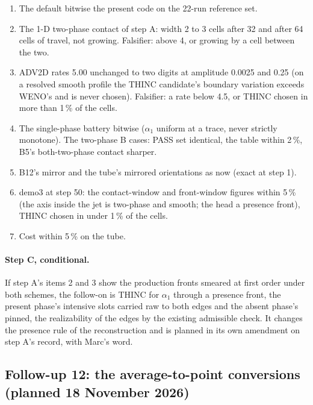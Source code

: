 \documentclass[11pt,a4paper]{article}
\begin{document}
\begin{enumerate}[nosep]
\item The default bitwise the present code on the 22-run reference set.
\item The 1-D two-phase contact of step A: width 2 to 3 cells after 32
      and after 64 cells of travel, not growing.  Falsifier: above 4, or
      growing by a cell between the two.
\item ADV2D rates 5.00 unchanged to two digits at amplitude 0.0025 and
      0.25 (on a resolved smooth profile the THINC candidate's boundary
      variation exceeds WENO's and is never chosen).  Falsifier: a rate
      below 4.5, or THINC chosen in more than 1\,\% of the cells.
\item The single-phase battery bitwise ($\alpha_1$ uniform at a trace,
      never strictly monotone).  The two-phase B cases: PASS set
      identical, the table within 2\,\%, B5's both-two-phase contact
      sharper.
\item B12's mirror and the tube's mirrored orientations as now (exact
      at step 1).
\item demo3 at step 50: the contact-window and front-window figures
      within 5\,\% (the axis inside the jet is two-phase and smooth; the
      head a presence front), THINC chosen in under 1\,\% of the cells.
\item Cost within 5\,\% on the tube.
\end{enumerate}

\paragraph{Step C, conditional.}  If step A's items 2 and 3 show the
production fronts smeared at first order under both schemes, the
follow-on is THINC for $\alpha_1$ through a presence front, the present
phase's intensive slots carried raw to both edges and the absent phase's
pinned, the realizability of the edges by the existing admissible
check.  It changes the presence rule of the reconstruction and is
planned in its own amendment on step A's record, with Marc's word.

\subsection*{Follow-up 12: the average-to-point conversions (planned 18 November 2026)}
\end{document}
